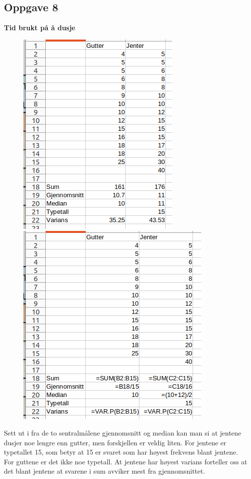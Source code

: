 \newpage
\subsection*{Oppgave 8}
\textbf{Tid brukt på å dusje}
\begin{figure}
	\centering
	\includegraphics[scale=0.3]{opg8a} \;
	\includegraphics[scale=0.3]{opg8b}
\end{figure}
Sett ut i fra de to sentralmålene gjennomsnitt og median kan man si at jentene dusjer noe lengre enn gutter, men forskjellen er veldig liten. For jentene er typetallet 15, som betyr at 15 er svaret som har høyest frekvens blant jentene. For guttene er det ikke noe typetall. At jentene har høyest varians forteller oss at det blant jentene at svarene i sum avviker mest fra gjennomsnittet. \vsk


